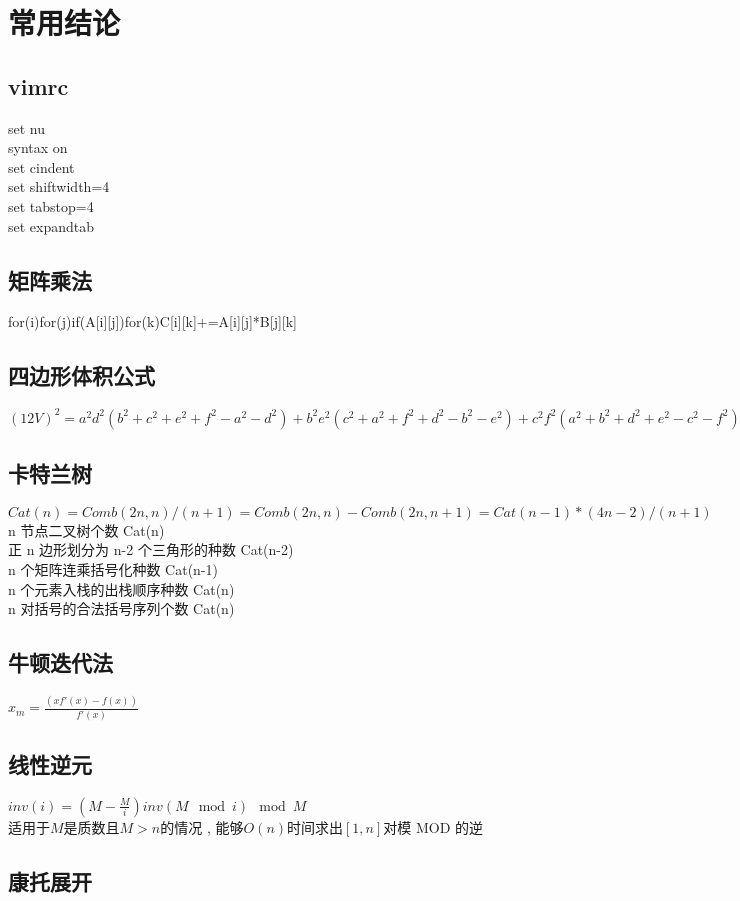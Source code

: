 \section{常用结论}
\subsection{vimrc}
set nu \\
syntax on \\
set cindent \\
set shiftwidth=4 \\
set tabstop=4 \\ 
set expandtab \\
\subsection{矩阵乘法}
for(i)for(j)if(A[i][j])for(k)C[i][k]+=A[i][j]*B[j][k]
\subsection{四边形体积公式}
$ (12V)^2 = a^2d^2(b^2 + c^2 + e^2 + f^2 − a^2 − d^2) + b^2e^2(c^2 + a^2 + f^2 + d^2 − b^2 − e^2) + c^2f^2(a^2 + b^2 + d^2 + e^2 −c^2 − f^2) − a^2b^2c^2 − a^2e^2f^2 − d^2b^2f^2 − d^2e^2c^2 $
\subsection{卡特兰树}
$ Cat(n)=Comb(2n,n)/(n+1)=Comb(2n,n)-Comb(2n,n+1)=Cat(n-1)*(4n-2)/(n+1) $ \\
n 节点二叉树个数 Cat(n) \\
正 n 边形划分为 n-2 个三角形的种数 Cat(n-2) \\
n 个矩阵连乘括号化种数 Cat(n-1) \\
n 个元素入栈的出栈顺序种数 Cat(n) \\
n 对括号的合法括号序列个数 Cat(n) \\
\subsection{牛顿迭代法}
$ x_m = \frac{(xf'(x)-f(x))}{f'(x)} $
\subsection{线性逆元}
$ inv(i) = (M - \frac{M}{i}) inv(M \mod i) \mod M $ \\
适用于$ M $是质数且$ M > n $的情况 , 能够$ O(n) $时间求出$ [1, n] $对模 MOD 的逆
\subsection{康托展开}
